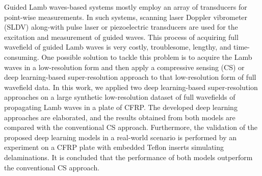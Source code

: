 Guided Lamb waves-based systems mostly employ an array of transducers for point-wise measurements. 
In such systems, scanning laser Doppler vibrometer
(SLDV) along-with pulse laser or piezoelectric transducers are used for the excitation and measurement of guided waves. 
This process of acquiring full wavefield of guided Lamb waves is very costly, troublesome, lengthy, and time-consuming.
One possible solution to tackle this problem is to acquire the Lamb waves in a low-resolution form and then apply a compressive sensing (CS) or deep learning-based super-resolution approach to that low-resolution form of
full wavefield data. 
In this work, we applied two deep learning-based
super-resolution approaches on a large synthetic low-resolution dataset of full wavefields of propagating Lamb waves in a plate of CFRP. 
The developed deep learning approaches are
elaborated, and the results obtained from both models are compared with the conventional CS approach. 
Furthermore, the validation of the proposed deep learning models in a real-world scenario is performed by an experiment on a CFRP plate with embedded Teflon inserts simulating delaminations. 
It is concluded that the performance of both models outperform the conventional CS approach.